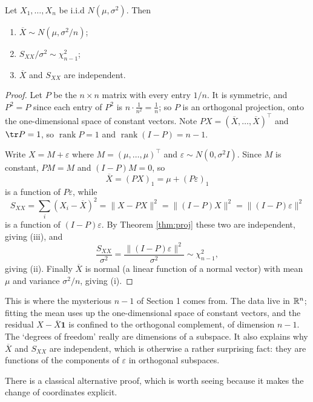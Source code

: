 \documentclass[a4paper]{scrartcl}
\newcommand{\rank}{\operatorname{rank}}
\begin{document}
\begin{theorem}\label{thm:xbarsxx}
  Let $X_1,\dots,X_n$ be i.i.d $N(\mu,\sigma^2)$. Then
  \begin{enumerate}[label=(\roman*)]
    \item $\overline{X}\sim N\left(\mu, \sigma^2/n\right)$;
    \item $S_{XX}/\sigma^2 \sim \chi^2_{n-1}$;
    \item $\overline{X}$ and $S_{XX}$ are independent.
  \end{enumerate}
\end{theorem}
\begin{proof}
  Let $P$ be the $n\times n$ matrix with every entry $1/n$. It is symmetric, and $P^2 = P$ since each entry of $P^2$ is $n \cdot \frac{1}{n^2} = \frac 1n$; so $P$ is an orthogonal projection, onto the one-dimensional space of constant vectors. Note $PX = (\overline{X},\dots,\overline{X})^\top$ and $\tr P = 1$, so $\rank P = 1$ and $\rank(I-P) = n-1$.

  Write $X = M + \varepsilon$ where $M = (\mu,\dots,\mu)^\top$ and $\varepsilon \sim N(0,\sigma^2 I)$. Since $M$ is constant, $PM = M$ and $(I-P)M = 0$, so
  $$
  \overline{X} = (PX)_1 = \mu + (P\varepsilon)_1
  $$
  is a function of $P\varepsilon$, while
  $$
  S_{XX} = \sum_i(X_i - \overline{X})^2 = \|X - PX\|^2 = \|(I-P)X\|^2 = \|(I-P)\varepsilon\|^2
  $$
  is a function of $(I-P)\varepsilon$. By Theorem \ref{thm:proj} these two are independent, giving (iii), and
  $$
  \frac{S_{XX}}{\sigma^2} = \frac{\|(I-P)\varepsilon\|^2}{\sigma^2} \sim \chi^2_{n-1},
  $$
  giving (ii). Finally $\overline{X}$ is normal (a linear function of a normal vector) with mean $\mu$ and variance $\sigma^2/n$, giving (i).
\end{proof}

\begin{remark}
  This is where the mysterious $n-1$ of Section 1 comes from. The data live in $\mathbb{R}^n$; fitting the mean uses up the one-dimensional space of constant vectors, and the residual $X - \overline{X}\mathbf{1}$ is confined to the orthogonal complement, of dimension $n-1$. The `degrees of freedom' really are dimensions of a subspace. It also explains why $\overline X$ and $S_{XX}$ are independent, which is otherwise a rather surprising fact: they are functions of the components of $\varepsilon$ in orthogonal subspaces.
\end{remark}

There is a classical alternative proof, which is worth seeing because it makes the change of coordinates explicit.
\end{document}
